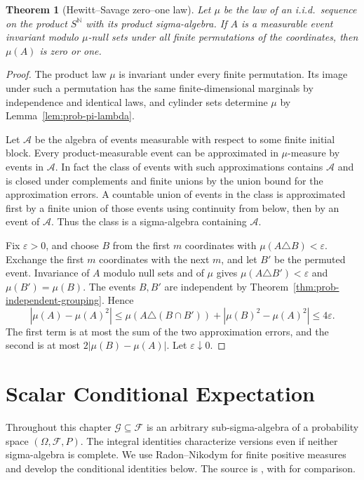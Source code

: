 \documentclass[11pt,oneside,openany]{book}
\theoremstyle{plain}
\newtheorem{theorem}{Theorem}[chapter]
\theoremstyle{definition}
\theoremstyle{remark}
\begin{document}
\begin{theorem}[Hewitt--Savage zero--one law]
\label{thm:prob-hewitt-savage}
Let \(\mu\) be the law of an i.i.d.\ sequence on the product
\(S^{\mathbb N}\) with its product sigma-algebra. If \(A\) is a
measurable event invariant modulo \(\mu\)-null sets under all
finite permutations of the coordinates, then \(\mu(A)\) is zero
or one.
\end{theorem}
\begin{proof}
The product law \(\mu\) is invariant under every finite permutation.
Its image under such a permutation has the same finite-dimensional
marginals by independence and identical laws, and cylinder sets
determine \(\mu\) by Lemma~\ref{lem:prob-pi-lambda}.

Let \(\mathcal A\) be the algebra of events measurable with respect
to some finite initial block. Every product-measurable event can
be approximated in \(\mu\)-measure by events in \(\mathcal A\).
In fact the class of events with such approximations contains
\(\mathcal A\) and is closed under complements and finite unions
by the union bound for the approximation errors. A countable
union of events in the class is approximated first by a finite
union of those events using continuity from below, then by an
event of \(\mathcal A\). Thus the class is a sigma-algebra
containing \(\mathcal A\).

Fix \(\varepsilon>0\), and choose \(B\) from the first \(m\)
coordinates with \(\mu(A\triangle B)<\varepsilon\). Exchange the
first \(m\) coordinates with the next \(m\), and let \(B'\) be the
permuted event. Invariance of \(A\) modulo null sets and of \(\mu\)
gives \(\mu(A\triangle B')<\varepsilon\) and
\(\mu(B')=\mu(B)\). The events \(B,B'\) are independent by
Theorem~\ref{thm:prob-independent-grouping}. Hence
\[
 |\mu(A)-\mu(A)^2|
 \le \mu(A\triangle(B\cap B'))+|\mu(B)^2-\mu(A)^2|
 \le 4\varepsilon .
\]
The first term is at most the sum of the two approximation
errors, and the second is at most \(2|\mu(B)-\mu(A)|\).
Let \(\varepsilon\downarrow0\).
\end{proof}
\chapter{Scalar Conditional Expectation}
\label{chap:probability-conditional-expectation}

Throughout this chapter \(\mathcal G\subseteq\mathcal F\) is an
arbitrary sub-sigma-algebra of a probability space
\((\Omega,\mathcal F,P)\). The integral identities characterize
versions even if neither sigma-algebra is complete. We use
Radon--Nikodym for finite positive measures and develop the
conditional identities below. The source is
\cite[Theorems 8.1--8.4]{Kallenberg}, with
\cite[Section 4.1]{Durrett} for comparison.
\end{document}
